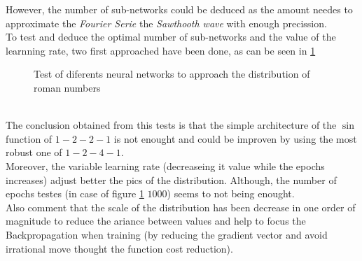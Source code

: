 \documentclass[a4paper, 11pt]{article}
\begin{document}
However, the number of sub-networks could be deduced as the amount needes to approximate the \textit{Fourier Serie} the \textit{Sawthooth wave} with enough precission.\\
To test and deduce the optimal number of sub-networks and the value of the learnning rate, two first approached have been done, as can be seen in \ref{first-approach}
\begin{figure}[h]
    \centering
    \hspace{1em}
    \caption{Test of diferents neural networks to approach the distribution of roman numbers}
    \label{first-approach}
\end{figure}\\
The conclusion obtained from this tests is that the simple architecture of the $\sin$ function of $1-2-2-1$ is not enought and could be improven by using the most robust one of $1-2-4-1$.\\
Moreover, the variable learning rate (decreaseing it value while the epochs increases) adjust better the pics of the distribution. Although, the number of epochs testes (in case of figure \ref{first-approach} $1000$) seems to not being enought.\\
Also comment that the scale of the distribution has been decrease in one order of magnitude to reduce the ariance between values and help to focus the Backpropagation when training (by reducing the gradient vector and avoid irrational move thought the function cost reduction).
\end{document}
